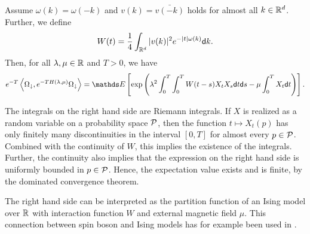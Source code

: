 \documentclass[a4paper,12pt,oneside]{article}
\newcommand{\Od}{{\Omega_\downarrow}}
\begin{document}
\begin{thm}\label{thm:FKN} Assume $\omega(k)=\omega(-k)$ and $v(k)=\bar{v(-k)}$ holds for almost all $k\in{\mathbb R}^d$.
	Further, we define
	\[ W(t)= \frac 14 \int_{{\mathbb R}^d}|v(k)|^2e^{-|t|\omega(k)}{\mathsf d} k.\]
	 Then, for all $\lambda,\mu\in{\mathbb R}$ and $T>0$, we have
	\[ e^{-T}\Braket{\Od,e^{-TH(\lambda,\mu)}\Od} = \EE\left[\exp\left(\lambda^2 \int_0^T\int_0^T W(t-s)X_tX_s\d t \d s - \mu \int_0^T X_t \d t\right)\right].  \]
\end{thm}
\begin{rem}
	The integrals on the right hand side are Riemann integrals. If $X$ is realized as a random variable on a probability space ${\mathcal P}$, then the function $t\mapsto X_t(p)$ has only finitely many discontinuities in the interval $[0,T]$ for almost every $p\in{\mathcal P}$. Combined with the continuity of $W$, this implies the existence of the integrals. Further, the continuity also implies that the expression on the right hand side is uniformly bounded in $p\in{\mathcal P}$. Hence, the expectation value exists and is finite, by the dominated convergence theorem.
\end{rem}
\begin{rem}\label{rem:Ising}
	The right hand side can be interpreted as the partition function of an Ising model over ${\mathbb R}$ with interaction function $W$ and external magnetic field $\mu$. This connection between spin boson and Ising models has for example been used in \cite{EmeryLuther.1974,FannesNachtergaele.1988,Spohn.1989,Abdessalam.2011,HirokawaHiroshimaLorinczi.2014}.
\end{rem}
\end{document}
